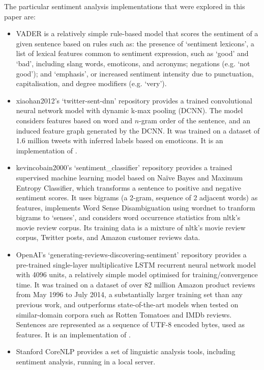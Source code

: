 \documentclass{report}
\begin{document}
The particular sentiment analysis implementations that were explored in this paper are:
\begin{itemize}
	\item VADER \cite{VADER} is a relatively simple rule-based model that scores the sentiment of a given sentence based on rules such as: the presence of `sentiment lexicons', a list of lexical features common to sentiment expression, such as `good' and `bad', including slang words, emoticons, and acronyms; negations (e.g. `not good'); and `emphasis', or increased sentiment intensity due to punctuation, capitalisation, and degree modifiers (e.g. `very').
	\item xiaohan2012's `twitter-sent-dnn' repository provides a trained convolutional neural network model with dynamic k-max pooling (DCNN).
		The model considers features based on word and $n$-gram order of the sentence, and an induced feature graph generated by the DCNN.
		It was trained on a dataset of 1.6 million tweets with inferred labels based on emoticons.
		It is an implementation of \cite{kalchbrennerACL2014}.
	\item kevincobain2000's `sentiment\_classifier' repository \cite{kevincobain} provides a trained supervised machine learning model based on Na\"{i}ve Bayes and Maximum Entropy Classifier, which transforms a sentence to positive and negative sentiment scores.
		It uses bigrams (a 2-gram, sequence of 2 adjacent words) as features, implements Word Sense Disambiguation using wordnet \cite{banerjee2002adapted} to tranform bigrams to `senses', and considers word occurrence statistics from nltk's movie review corpus.
		Its training data is a mixture of nltk's movie review corpus, Twitter posts, and Amazon customer reviews data. 
	\item OpenAI's `generating-reviews-discovering-sentiment' repository provides a pre-trained single-layer multiplicative LSTM recurrent neural network model with 4096 units, a relatively simple model optimised for training/convergence time.
		It was trained on a dataset of over 82 million Amazon product reviews from May 1996 to July 2014, a substantially larger training set than any previous work, and outperforms state-of-the-art models when tested on similar-domain corpora such as Rotten Tomatoes and IMDb reviews.
		Sentences are represented as a sequence of UTF-8 encoded bytes, used as features. 
		It is an implementation of \cite{OpenAI}.
	\item Stanford CoreNLP \cite{StanfordNLP} provides a set of linguistic analysis tools, including sentiment analysis, running in a local server.

\end{itemize}
\end{document}
